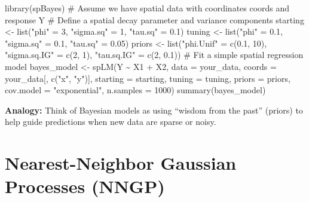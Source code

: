 \documentclass[
  11pt,
]{report}
\newenvironment{Shaded}{\begin{snugshade}}{\end{snugshade}}
\newcommand{\AttributeTok}[1]{\textcolor[rgb]{0.40,0.45,0.13}{#1}}
\newcommand{\CommentTok}[1]{\textcolor[rgb]{0.37,0.37,0.37}{#1}}
\newcommand{\DecValTok}[1]{\textcolor[rgb]{0.68,0.00,0.00}{#1}}
\newcommand{\FloatTok}[1]{\textcolor[rgb]{0.68,0.00,0.00}{#1}}
\newcommand{\FunctionTok}[1]{\textcolor[rgb]{0.28,0.35,0.67}{#1}}
\newcommand{\NormalTok}[1]{\textcolor[rgb]{0.00,0.23,0.31}{#1}}
\newcommand{\OtherTok}[1]{\textcolor[rgb]{0.00,0.23,0.31}{#1}}
\newcommand{\SpecialCharTok}[1]{\textcolor[rgb]{0.37,0.37,0.37}{#1}}
\newcommand{\StringTok}[1]{\textcolor[rgb]{0.13,0.47,0.30}{#1}}
\begin{document}
\begin{Shaded}
\begin{Highlighting}[]
\FunctionTok{library}\NormalTok{(spBayes)}
\CommentTok{\# Assume we have spatial data with coordinates \textquotesingle{}coords\textquotesingle{} and response \textquotesingle{}Y\textquotesingle{}}
\CommentTok{\# Define a spatial decay parameter and variance components}
\NormalTok{starting }\OtherTok{\textless{}{-}} \FunctionTok{list}\NormalTok{(}\StringTok{"phi"} \OtherTok{=} \DecValTok{3}\NormalTok{, }\StringTok{"sigma.sq"} \OtherTok{=} \DecValTok{1}\NormalTok{, }\StringTok{"tau.sq"} \OtherTok{=} \FloatTok{0.1}\NormalTok{)}
\NormalTok{tuning   }\OtherTok{\textless{}{-}} \FunctionTok{list}\NormalTok{(}\StringTok{"phi"} \OtherTok{=} \FloatTok{0.1}\NormalTok{, }\StringTok{"sigma.sq"} \OtherTok{=} \FloatTok{0.1}\NormalTok{, }\StringTok{"tau.sq"} \OtherTok{=} \FloatTok{0.05}\NormalTok{)}
\NormalTok{priors   }\OtherTok{\textless{}{-}} \FunctionTok{list}\NormalTok{(}\StringTok{"phi.Unif"} \OtherTok{=} \FunctionTok{c}\NormalTok{(}\FloatTok{0.1}\NormalTok{, }\DecValTok{10}\NormalTok{), }\StringTok{"sigma.sq.IG"} \OtherTok{=} \FunctionTok{c}\NormalTok{(}\DecValTok{2}\NormalTok{, }\DecValTok{1}\NormalTok{), }\StringTok{"tau.sq.IG"} \OtherTok{=} \FunctionTok{c}\NormalTok{(}\DecValTok{2}\NormalTok{, }\FloatTok{0.1}\NormalTok{))}
\CommentTok{\# Fit a simple spatial regression model}
\NormalTok{bayes\_model }\OtherTok{\textless{}{-}} \FunctionTok{spLM}\NormalTok{(Y }\SpecialCharTok{\textasciitilde{}}\NormalTok{ X1 }\SpecialCharTok{+}\NormalTok{ X2, }
                    \AttributeTok{data =}\NormalTok{ your\_data, }
                    \AttributeTok{coords =}\NormalTok{ your\_data[, }\FunctionTok{c}\NormalTok{(}\StringTok{"x"}\NormalTok{, }\StringTok{"y"}\NormalTok{)],}
                    \AttributeTok{starting =}\NormalTok{ starting, }
                    \AttributeTok{tuning =}\NormalTok{ tuning, }
                    \AttributeTok{priors =}\NormalTok{ priors, }
                    \AttributeTok{cov.model =} \StringTok{"exponential"}\NormalTok{, }
                    \AttributeTok{n.samples =} \DecValTok{1000}\NormalTok{)}
\FunctionTok{summary}\NormalTok{(bayes\_model)}
\end{Highlighting}
\end{Shaded}

\textbf{Analogy:} Think of Bayesian models as using ``wisdom from the
past'' (priors) to help guide predictions when new data are sparse or
noisy.

\section{Nearest-Neighbor Gaussian Processes
(NNGP)}\label{nearest-neighbor-gaussian-processes-nngp}
\end{document}
